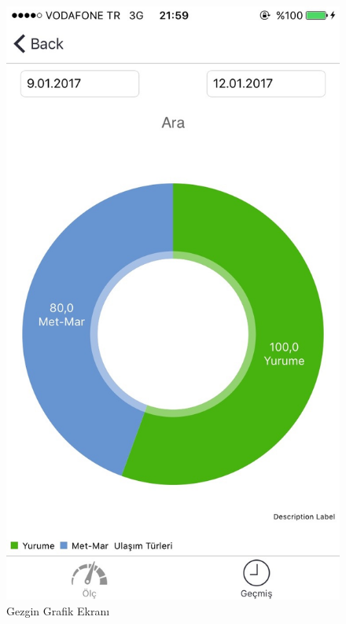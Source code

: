 \begin{figure}[!htbp]
\centering
\includegraphics[scale=0.2]{projectChapters/images/IMG_0376.jpg}
\caption{Gezgin Grafik Ekranı}
\end{figure}